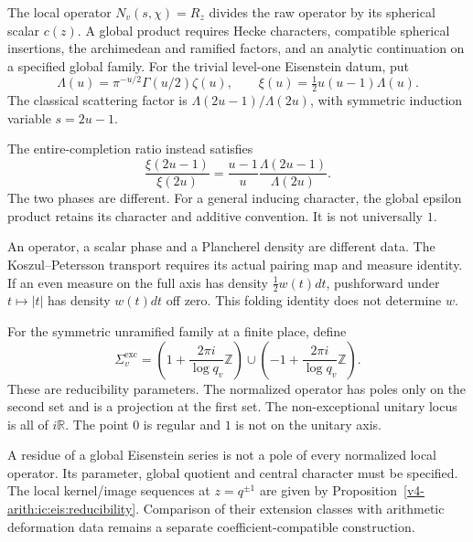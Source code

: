 \begin{remark}
\label{v4-arith:ic:w6-d:rem:W6C-relation}
The local operator $N_v(s,\chi)=R_z$ divides the raw operator by its
spherical scalar $c(z)$. A global product requires Hecke characters,
compatible spherical insertions, the archimedean and ramified factors,
and an analytic continuation on a specified global family.
For the trivial level-one Eisenstein datum, put
\[
 \Lambda(u)=\pi^{-u/2}\Gamma(u/2)\zeta(u),\qquad
 \xi(u)=\tfrac12u(u-1)\Lambda(u).
\]
The classical scattering factor is $\Lambda(2u-1)/\Lambda(2u)$,
with symmetric induction variable $s=2u-1$.

The entire-completion ratio instead satisfies
\[
 \frac{\xi(2u-1)}{\xi(2u)}
   =\frac{u-1}{u}\frac{\Lambda(2u-1)}{\Lambda(2u)}.
\]
The two phases are different. For a general inducing character,
the global epsilon product retains its character and additive
convention. It is not universally $1$.

An operator, a scalar phase and a Plancherel density are different data.
The Koszul--Petersson transport requires its actual pairing map
and measure identity. If an even measure on the full axis has density
$\tfrac12 w(t)dt$, pushforward under $t\mapsto|t|$ has density
$w(t)dt$ off zero. This folding identity does not determine $w$.
\end{remark}

\begin{definition}
\label{v4-arith:ic:w6-d:def:exceptional}
For the symmetric unramified family at a finite place, define
\begin{equation}
\label{v4-arith:ic:w6-d:eq:exceptional}
 \Sigma_v^{\mathrm{exc}}=
 \left(1+\frac{2\pi i}{\log q_v}\mathbb Z\right)
 \cup\left(-1+\frac{2\pi i}{\log q_v}\mathbb Z\right).
\end{equation}
These are reducibility parameters. The normalized operator has poles
only on the second set and is a projection at the first set. The
non-exceptional unitary locus is all of $i\mathbb R$. The point $0$
is regular and $1$ is not on the unitary axis.
\end{definition}
\begin{remark}
\label{v4-arith:ic:w6-d:rem:exceptional-form}
A residue of a global Eisenstein series is not a pole of every normalized
local operator. Its parameter, global quotient and central character
must be specified. The local kernel/image sequences at $z=q^{\pm1}$
are given by Proposition~\ref{v4-arith:ic:eis:reducibility}. Comparison of
their extension classes with arithmetic deformation data remains a
separate coefficient-compatible construction.
\end{remark}


